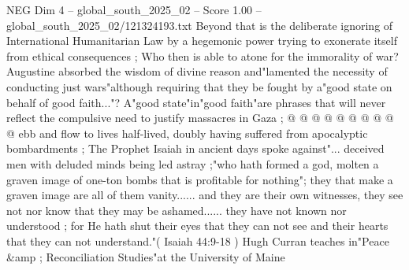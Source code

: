 \begin{textsample}{NEG Dim 4 – global\_south\_2025\_02 – Score 1.00 – global\_south\_2025\_02/121324193.txt}
Beyond that is the deliberate ignoring of International Humanitarian Law by a hegemonic power trying to exonerate itself from ethical consequences ; Who then is able to atone for the immorality of war?
Augustine absorbed the wisdom of divine reason and"lamented the necessity of conducting just wars"although requiring that they be fought by a"good state on behalf of good faith..."?
A"good state"in"good faith"are phrases that will never reflect the compulsive need to justify massacres in Gaza ; @ @ @ @ @ @ @ @ @ @ ebb and flow to lives half-lived, doubly having suffered from apocalyptic bombardments ; The Prophet Isaiah in ancient days spoke against"... deceived men with deluded minds being led astray ;"who hath formed a god, molten a graven image of one-ton bombs that is profitable for nothing"; they that make a graven image are all of them vanity...... and they are their own witnesses, they see not nor know that they may be ashamed...... they have not known nor understood ; for He hath shut their eyes that they can not see and their hearts that they can not understand."( Isaiah 44:9-18 ) Hugh Curran teaches in"Peace \&amp ; Reconciliation Studies"at the University of Maine

\end{textsample}
